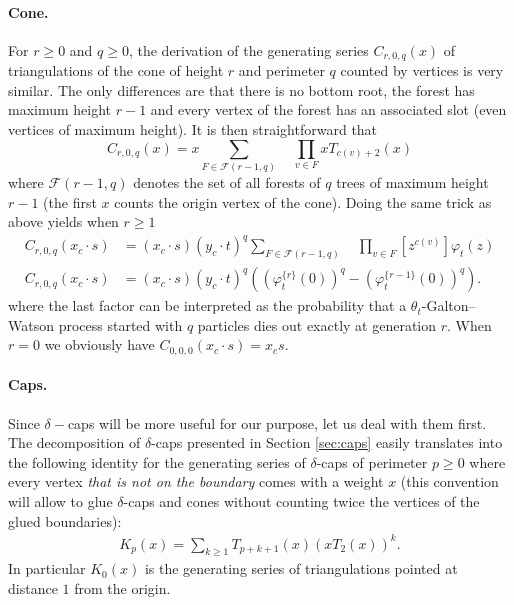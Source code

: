 \documentclass[AHL,XML,longabstracts,Unicode,NoSaveZebib]{cedram}
\begin{document}
\paragraph{Cone.} For $r\geq 0$ and $q\geq 0$, the derivation of the generating series $C_{r,0,q}(x)$ of triangulations of the cone of height $r$ and perimeter $q$ counted by vertices is very similar. The only differences are that there is no bottom root, the forest has maximum height $r-1$ and every vertex of the forest has an associated slot (even vertices of maximum height). It is then straightforward that
\[
C_{r,0,q}(x) = x \sum_{F \in \mathcal{F}(r-1,q)} \quad \prod_{v \in F} x T_{c(v)+2}(x)
\]
where $\mathcal{F}(r-1,q)$ denotes the set of all forests of $q$ trees of maximum height $r-1$ (the first $x$ counts the origin vertex of the cone). Doing the same trick as above yields when $r \geq 1$
\begin{align}
C_{r,0,q}(x_c \cdot s)
&= (x_c \cdot s) (y_c \cdot t)^{q} \sum_{F \in \mathcal{F}(r-1,q)} \quad \prod_{v \in F}
\left[ z^{c(v)}  \right]\varphi_t(z)\nonumber \\
\label{eq:gencone}
C_{r,0,q}(x_c \cdot s) &=
(x_c \cdot s) (y_c \cdot t)^{q}
\left( \left(\varphi_t^{\{r\}} (0) \right)^q - \left(\varphi_t^{\{r-1\}} (0) \right)^q \right).
\end{align}
where the last factor can be interpreted as the probability that a $\theta_{t}$-Galton--Watson process started with $q$ particles dies out exactly at generation $r$. When $r=0$ we obviously have $C_{0,0,0}(x_c \cdot s) = x_{c}  s$.

\paragraph{Caps.} Since $\delta-$caps will be more useful for our purpose, let us deal with them first.
The decomposition of $\delta$-caps presented in Section \ref{sec:caps} easily translates into the following identity for the generating series of $\delta$-caps of perimeter $p \geq 0$ where every vertex \emph{that is not on the boundary} comes with a weight $x$ (this convention will allow to glue $\delta$-caps and cones without counting twice the vertices of the glued boundaries):
\begin{align}
\label{eq:crowngs}
K_p(x) =
\sum_{k \geq 1} T_{p+k+1} (x) \left( xT_2(x) \right)^k.
\end{align}
In particular $K_{0}(x)$ is the generating series of triangulations pointed at distance $1$ from the origin.
\end{document}
